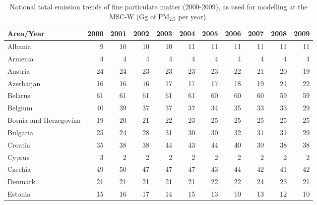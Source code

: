  \begin{table}
 \caption{National total emission trends of  fine particulate matter (2000-2009), as used for modelling at the MSC-W (Gg of PM$_{2.5}$ per year).}
 
 \vspace{15pt}
 
 \scriptsize
 \centering
 \begin{tabular}{|l|r|r|r|r|r|r|r|r|r|r|}
 \hline
                     Area/Year&   2000&   2001&   2002&   2003&   2004&   2005&   2006&   2007&   2008&   2009\\\hline\hline
                       Albania&      9&     10&     10&     10&     11&     11&     11&     11&     11&     11\\\hline
                       Armenia&      4&      4&      4&      4&      4&      4&      4&      4&      4&      4\\\hline
                       Austria&     24&     24&     23&     23&     23&     23&     22&     21&     20&     19\\\hline
                    Azerbaijan&     16&     16&     16&     17&     17&     17&     18&     19&     21&     22\\\hline
                       Belarus&     61&     61&     61&     61&     61&     60&     60&     60&     59&     59\\\hline
                       Belgium&     40&     39&     37&     37&     37&     34&     35&     33&     33&     29\\\hline
        Bosnia and Herzegovina&     19&     20&     21&     22&     23&     25&     25&     25&     25&     25\\\hline
                      Bulgaria&     25&     24&     28&     31&     30&     30&     32&     31&     31&     29\\\hline
                       Croatia&     35&     38&     38&     44&     43&     44&     40&     39&     38&     38\\\hline
                        Cyprus&      3&      2&      2&      2&      2&      2&      2&      2&      2&      2\\\hline
                       Czechia&     49&     50&     47&     47&     47&     43&     44&     42&     41&     42\\\hline
                       Denmark&     21&     21&     21&     21&     21&     22&     22&     24&     23&     21\\\hline
                       Estonia&     15&     16&     17&     14&     15&     13&     10&     13&     12&     10\\\hline

\end{tabular}
\end{table}
